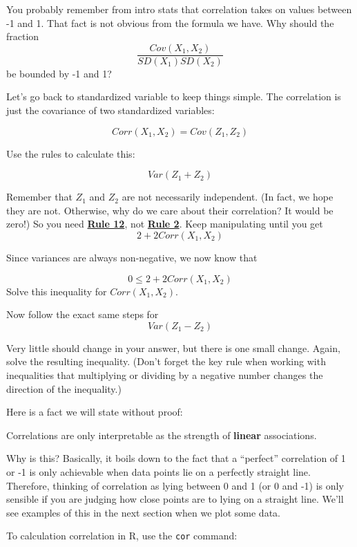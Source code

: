 \documentclass[
]{book}
\newenvironment{Shaded}{\begin{snugshade}}{\end{snugshade}}
\newcommand{\FunctionTok}[1]{\textcolor[rgb]{0.00,0.00,0.00}{#1}}
\newcommand{\NormalTok}[1]{#1}
\newcommand{\SpecialCharTok}[1]{\textcolor[rgb]{0.00,0.00,0.00}{#1}}
\begin{document}
You probably remember from intro stats that correlation takes on values between -1 and 1. That fact is not obvious from the formula we have. Why should the fraction
\[
\frac{Cov(X_{1},X_{2})}{SD(X_{1}) SD(X_{2})}
\]
be bounded by -1 and 1?

Let's go back to standardized variable to keep things simple. The correlation is just the covariance of two standardized variables:

\[
Corr(X_{1}, X_{2}) = Cov(Z_{1}, Z_{2})
\]

Use the rules to calculate this:

\[
Var(Z_{1} + Z_{2})
\]

Remember that \(Z_{1}\) and \(Z_{2}\) are not necessarily independent. (In fact, we hope they are not. Otherwise, why do we care about their correlation? It would be zero!) So you need \protect\hyperlink{Rule12}{\textbf{Rule 12}}, not \href{./variance.html\#Rule2}{\textbf{Rule 2}}. Keep manipulating until you get
\[
2 + 2Corr(X_{1}, X_{2})
\]

Since variances are always non-negative, we now know that

\[
0 \leq 2 + 2Corr(X_{1}, X_{2})
\]
Solve this inequality for \(Corr(X_{1}, X_{2})\).

Now follow the exact same steps for
\[
Var(Z_{1} - Z_{2})
\]

Very little should change in your answer, but there is one small change. Again, solve the resulting inequality. (Don't forget the key rule when working with inequalities that multiplying or dividing by a negative number changes the direction of the inequality.)

Here is a fact we will state without proof:

Correlations are only interpretable as the strength of \textbf{linear} associations.

Why is this? Basically, it boils down to the fact that a ``perfect'' correlation of 1 or -1 is only achievable when data points lie on a perfectly straight line. Therefore, thinking of correlation as lying between 0 and 1 (or 0 and -1) is only sensible if you are judging how close points are to lying on a straight line. We'll see examples of this in the next section when we plot some data.

To calculation correlation in R, use the \texttt{cor} command:

\begin{Shaded}
\end{Shaded}
\end{document}
